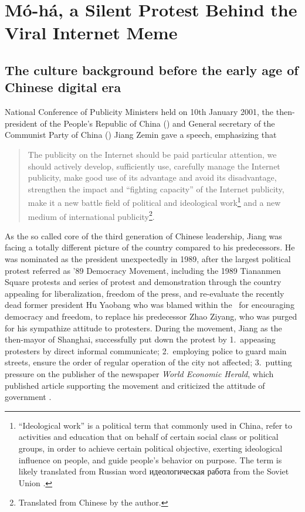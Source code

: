 \chapter[\Moha, a Silent Protest Behind the Viral Internet Meme]{{\sc M\'o-h\'a}, a Silent Protest Behind the Viral Internet Meme}\label{case}

\section{The culture background before the early age of Chinese digital era}
 National Conference of Publicity Ministers held on 10th January 2001, the then-president of the People's Republic of China (\prc) and General secretary of the Communist Party of China (\cpc) Jiang Zemin gave a speech, emphasizing that
\begin{quote}
	The publicity on the Internet should be paid particular attention, we should actively develop, sufficiently use, carefully manage the Internet publicity, make good use of its advantage and avoid its disadvantage, strengthen the impact and ``fighting capacity'' of the Internet publicity, make it a new battle field of political and ideological work\footnote{``Ideological work'' is a political term that commonly used in China, refer to activities and education that on behalf of certain social class or political groups, in order to achieve certain political objective, exerting ideological influence on people, and guide people's behavior on purpose. The term is likely translated from Russian word {идеологическая работа} from the Soviet Union \citep{__2008-1}.} and a new medium of international publicity\footnote{Translated from Chinese by the author.}. \citep{__2001}
\end{quote}

As the so called core of the third generation of Chinese leadership, Jiang was facing a totally different picture of the country compared to his predecessors. He was nominated as the president unexpectedly in 1989, after the largest political protest referred as '89 Democracy Movement, including the 1989 Tiananmen Square protests and series of protest and demonstration through the country appealing for liberalization, freedom of the press, and re-evaluate the recently dead former president Hu Yaobang who was blamed within the \cpc\ for encouraging democracy and freedom, to replace his predecessor Zhao Ziyang, who was purged for his sympathize attitude to protesters. During the movement, Jiang as the then-mayor of Shanghai, successfully put down the protest by 1.\ appeasing protesters by direct informal communicate; 2.\ employing police to guard main streets, ensure the order of regular operation of the city not affected; 3.\ putting pressure on the publisher of the newspaper \textit{World Economic Herald}, which published article supporting the movement and criticized the attitude of government \citep{kuhn_man_2005}.

